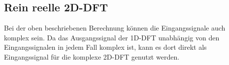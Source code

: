  



\subsection{Rein reelle 2D-DFT}\label{sec:rein_reelle_dft}
Bei der oben beschriebenen Berechnung können die Eingangssignale auch komplex sein. Da das Ausgangssignal der 1D-DFT unabhängig von den Eingangssignalen in jedem Fall 
komplex ist, kann es dort direkt als Eingangssignal für die komplexe 2D-DFT genutzt werden. 

